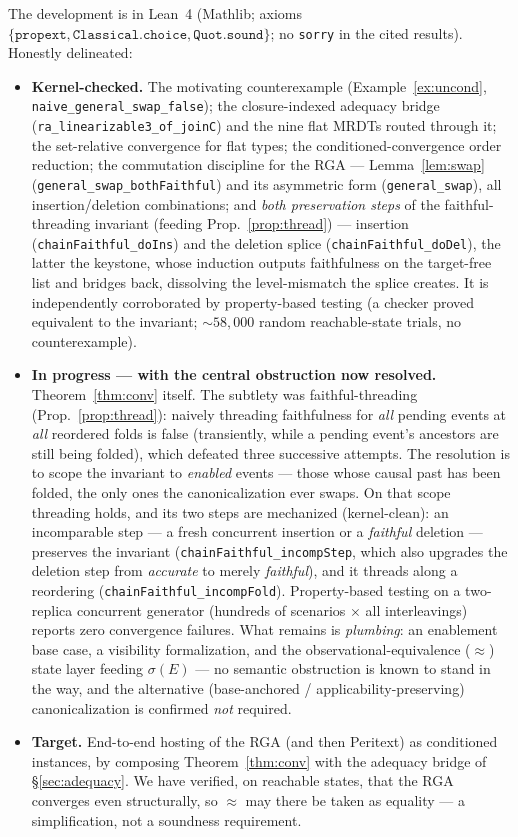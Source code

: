 \documentclass[11pt]{article}
\newcommand{\eqobs}{\approx}
\newcommand{\lean}[1]{\texttt{\small #1}}
\begin{document}
The development is in Lean~4 (Mathlib; axioms $\{\mathtt{propext},
\mathtt{Classical.choice}, \mathtt{Quot.sound}\}$; no \texttt{sorry} in the cited
results). Honestly delineated:

\begin{itemize}[leftmargin=1.4em]
\item \textbf{Kernel-checked.} The motivating counterexample
  (Example~\ref{ex:uncond}, \lean{naive\_general\_swap\_false}); the
  closure-indexed adequacy bridge (\lean{ra\_linearizable3\_of\_joinC}) and the
  nine flat MRDTs routed through it; the set-relative convergence for flat types;
  the conditioned-convergence order reduction; the commutation discipline for the
  RGA --- Lemma~\ref{lem:swap} (\lean{general\_swap\_bothFaithful}) and its
  asymmetric form (\lean{general\_swap}), all insertion/deletion combinations; and
  \emph{both preservation steps} of the faithful-threading invariant (feeding
  Prop.~\ref{prop:thread}) --- insertion (\lean{chainFaithful\_doIns}) and the
  deletion splice (\lean{chainFaithful\_doDel}), the latter the keystone,
  whose induction outputs faithfulness on the target-free list and bridges back,
  dissolving the level-mismatch the splice creates. It is independently
  corroborated by property-based testing (a checker proved equivalent to the
  invariant; $\sim\!58{,}000$ random reachable-state trials, no counterexample).
\item \textbf{In progress --- with the central obstruction now resolved.}
  Theorem~\ref{thm:conv} itself. The subtlety was faithful-threading
  (Prop.~\ref{prop:thread}): naively threading faithfulness for \emph{all}
  pending events at \emph{all} reordered folds is false (transiently, while a
  pending event's ancestors are still being folded), which defeated three
  successive attempts. The resolution is to scope the invariant to
  \emph{enabled} events --- those whose causal past has been folded, the only
  ones the canonicalization ever swaps. On that scope threading holds, and its
  two steps are mechanized (kernel-clean): an incomparable step --- a fresh
  concurrent insertion or a \emph{faithful} deletion --- preserves the
  invariant (\lean{chainFaithful\_incompStep}, which also upgrades the deletion
  step from \emph{accurate} to merely \emph{faithful}), and it threads along a
  reordering (\lean{chainFaithful\_incompFold}). Property-based testing on a
  two-replica concurrent generator (hundreds of scenarios $\times$ all
  interleavings) reports zero convergence failures. What remains is
  \emph{plumbing}: an enablement base case, a visibility formalization, and the
  observational-equivalence ($\eqobs$) state layer feeding $\sigma(E)$ --- no semantic
  obstruction is known to stand in the way, and the alternative
  (base-anchored / applicability-preserving) canonicalization is confirmed
  \emph{not} required.
\item \textbf{Target.} End-to-end hosting of the RGA (and then Peritext) as
  conditioned instances, by composing Theorem~\ref{thm:conv} with the adequacy
  bridge of \S\ref{sec:adequacy}. We have verified, on reachable states, that the
  RGA converges even structurally, so $\eqobs$ may there be taken as equality ---
  a simplification, not a soundness requirement.
\end{itemize}
\end{document}
